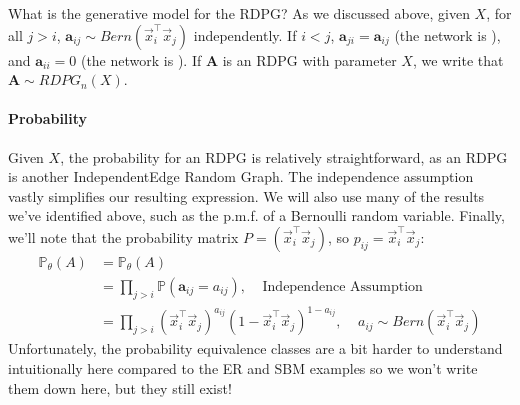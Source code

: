 \documentclass[letterpaper,10pt,english]{jupyterBook}
\begin{document}
\sphinxAtStartPar
What is the generative model for the  RDPG? As we discussed above, given \(X\), for all \(j > i\), \(\mathbf a_{ij} \sim Bern(\vec x_i^\top \vec x_j)\) independently. If \(i < j\), \(\mathbf a_{ji} = \mathbf a_{ij}\) (the network is ), and \(\mathbf a_{ii} = 0\) (the network is ). If \(\mathbf A\) is an  RDPG with parameter \(X\), we write that \(\mathbf A \sim RDPG_n(X)\).




\paragraph{Probability}
\label{\detokenize{representations/ch5/single-network-models_theory:id4}}
\sphinxAtStartPar
Given \(X\), the probability for an RDPG is relatively straightforward, as an RDPG is another Independent\sphinxhyphen{}Edge Random Graph. The independence assumption vastly simplifies our resulting expression. We will also use many of the results we’ve identified above, such as the p.m.f. of a Bernoulli random variable. Finally, we’ll note that the probability matrix \(P = (\vec x_i^\top \vec x_j)\), so \(p_{ij} = \vec x_i^\top \vec x_j\):
\begin{align*}
    \mathbb P_\theta(A) &= \mathbb P_\theta(A) \\
    &= \prod_{j > i}\mathbb P(\mathbf a_{ij} = a_{ij}),\;\;\;\; \textrm{Independence Assumption} \\
    &= \prod_{j > i}(\vec x_i^\top \vec x_j)^{a_{ij}}(1 - \vec x_i^\top \vec x_j)^{1 - a_{ij}},\;\;\;\; a_{ij} \sim Bern(\vec x_i^\top \vec x_j)
\end{align*}
\sphinxAtStartPar
Unfortunately, the probability equivalence classes are a bit harder to understand intuitionally here compared to the ER and SBM examples so we won’t write them down here, but they still exist!
\end{document}
